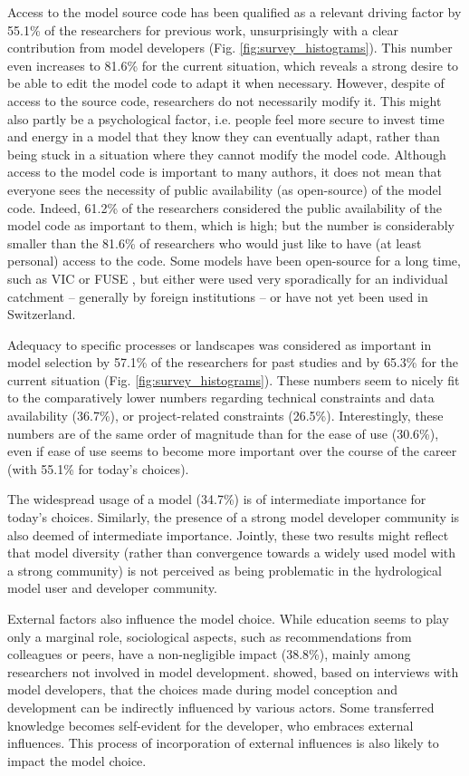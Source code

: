 \documentclass[10pt,a4paper]{article}
\begin{document}
Access to the model source code has been qualified as a relevant driving factor by 55.1\% of the researchers for previous work, unsurprisingly with a clear contribution from model developers (Fig. \ref{fig:survey_histograms}). This number even increases to 81.6\% for the current situation, which reveals a strong desire to be able to edit the model code to adapt it when necessary. However, despite of access to the source code, researchers do not necessarily modify it. This might also partly be a psychological factor, i.e. people feel more secure to invest time and energy in a model that they know they can eventually adapt, rather than being stuck in a situation where they cannot modify the model code. Although access to the model code is important to many authors, it does not mean that everyone sees the necessity of public availability (as open-source) of the model code. Indeed, 61.2\% of the researchers considered the public availability of the model code as important to them, which is high; but the number is considerably smaller than the 81.6\% of researchers who would just like to have (at least personal) access to the code. Some models have been open-source for a long time, such as VIC or FUSE \citep{Clark2008}, but either were used very sporadically for an individual catchment -- generally by foreign institutions -- or have not yet been used in Switzerland.

Adequacy to specific processes or landscapes was considered as important in model selection by 57.1\% of the researchers for past studies and by 65.3\% for the current situation (Fig. \ref{fig:survey_histograms}). These numbers seem to nicely fit to the comparatively lower numbers regarding technical constraints and data availability (36.7\%), or project-related constraints (26.5\%). Interestingly, these numbers are of the same order of magnitude than for the ease of use (30.6\%), even if ease of use seems to become more important over the course of the career (with 55.1\% for today's choices).

The widespread usage of a model (34.7\%) is of intermediate importance for today's choices. Similarly, the presence of a strong model developer community is also deemed of intermediate importance. Jointly, these two results might reflect that model diversity (rather than convergence towards a widely used model with a strong community) is not perceived as being problematic in the hydrological model user and developer community.

External factors also influence the model choice. While education seems to play only a marginal role, sociological aspects, such as recommendations from colleagues or peers, have a non-negligible impact (38.8\%), mainly among researchers not involved in model development. \citet{Babel2019} showed, based on interviews with model developers, that the choices made during model conception and development can be indirectly influenced by various actors. Some transferred knowledge becomes self-evident for the developer, who embraces external influences. This process of incorporation of external influences is also likely to impact the model choice.
\end{document}
